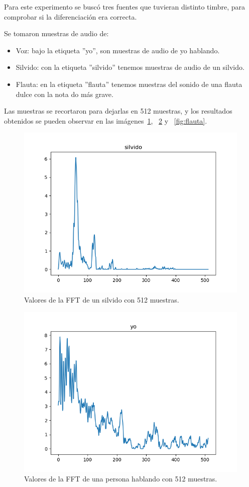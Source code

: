 \documentclass[a4paper, 12pt]{book}
\begin{document}
Para este experimento se buscó tres fuentes que tuvieran distinto timbre, para comprobar si la diferenciación era correcta.

Se tomaron muestras de audio de:
\begin{itemize}
	\item Voz: bajo la etiqueta ''yo'', son muestras de audio de yo hablando.
	\item Silvido: con la etiqueta ''silvido'' tenemos muestras de audio de un silvido.
	\item Flauta: en la etiqueta ''flauta'' tenemos muestras del sonido de una flauta dulce con la nota do más grave.
\end{itemize}

Las muestras se recortaron para dejarlas en 512 muestras, y los resultados obtenidos se pueden observar en las imágenes~\ref{fig:silvido}, ~\ref{fig:yo} y ~\ref{fig:flauta}.

\begin{figure}
	\centering
	\includegraphics[width=12cm, keepaspectratio]{img/silvido512.png}
	\caption{Valores de la FFT de un silvido con 512 muestras.}\label{fig:silvido}
\end{figure}

\begin{figure}
	\centering
	\includegraphics[width=12cm, keepaspectratio]{img/yo512.png}
	\caption{Valores de la FFT de una persona hablando con 512 muestras.}\label{fig:yo}
\end{figure}
\end{document}
